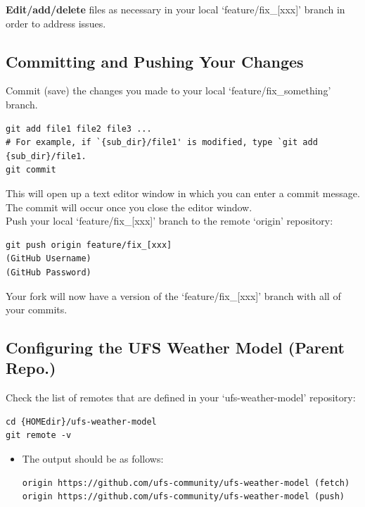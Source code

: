 \documentclass[11pt,fleqn]{report}              %
\begin{document}
{\bf Edit/add/delete} files as necessary in your local `feature/fix\_[xxx]' branch in order to address issues.



\subsection{Committing and Pushing Your Changes}

Commit (save) the changes you made to your local `feature/fix\_something' branch.
\lstset{language=bash}   
\begin{lstlisting}[frame=trBL]
git add file1 file2 file3 ...
# For example, if `{sub_dir}/file1' is modified, type `git add {sub_dir}/file1.
git commit
\end{lstlisting}
This will open up a text editor window in which you can enter a commit message. The commit will occur once you close the editor window. \\

Push your local `feature/fix\_[xxx]' branch to the remote `origin'  repository:
\lstset{language=bash}   
\begin{lstlisting}[frame=trBL]
git push origin feature/fix_[xxx]
(GitHub Username)
(GitHub Password)
\end{lstlisting}
Your fork will now have a version of the `feature/fix\_[xxx]' branch with all of your commits.



\subsection{Configuring the UFS Weather Model (Parent Repo.)}
\label{subsec:config_git_remote_ufs_weather}

Check the list of remotes that are defined in your `ufs-weather-model' repository:
\lstset{language=bash}   
\begin{lstlisting}[frame=trBL]
cd {HOMEdir}/ufs-weather-model
git remote -v
\end{lstlisting}

\begin{itemize}
\item The output should be as follows:
\lstset{language=bash}   
\begin{lstlisting}[frame=trBL]
origin https://github.com/ufs-community/ufs-weather-model (fetch)
origin https://github.com/ufs-community/ufs-weather-model (push)
\end{lstlisting}
\end{itemize}
\end{document}
